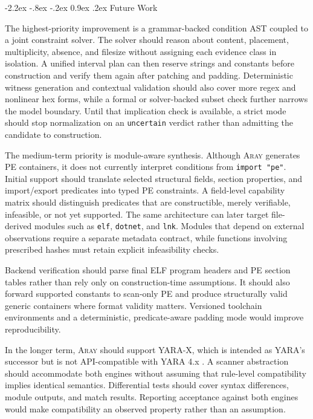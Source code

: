 \documentclass[11pt,twocolumn]{article}
\makeatletter
\newcommand{\tool}{\textsc{Aray}\xspace}
\newcommand{\code}[1]{\texttt{#1}}
\renewcommand\section{\@startsection{section}{1}{\z@}%
  {-2.2ex \@plus -.8ex \@minus -.2ex}%
  {0.9ex \@plus .2ex}%
  {\normalfont\large\bfseries}}
\makeatother
\begin{document}
\section{Future Work}

The highest-priority improvement is a grammar-backed condition AST coupled to a
joint constraint solver. The solver should reason about content, placement,
multiplicity, absence, and filesize without assigning each evidence class in
isolation. A unified interval plan can then reserve strings and constants before
construction and verify them again after patching and padding. Deterministic
witness generation and contextual validation should also cover more regex and
nonlinear hex forms, while a formal or solver-backed subset check further narrows
the model boundary. Until that implication check is available, a strict mode
should stop normalization on an \code{uncertain} verdict rather than admitting
the candidate to construction.

The medium-term priority is module-aware synthesis. Although \tool generates PE
containers, it does not currently interpret conditions from \code{import "pe"}.
Initial support should translate selected structural fields, section properties,
and import/export predicates into typed PE constraints. A field-level capability
matrix should distinguish predicates that are constructible, merely verifiable,
infeasible, or not yet supported. The same architecture can later target
file-derived modules such as \code{elf}, \code{dotnet}, and \code{lnk}. Modules
that depend on external observations require a separate metadata contract, while
functions involving prescribed hashes must retain explicit infeasibility checks.

Backend verification should parse final ELF program headers and PE section tables
rather than rely only on construction-time assumptions. It should also forward
supported constants to scan-only PE and produce structurally valid generic
containers where format validity matters. Versioned toolchain environments and a
deterministic, predicate-aware padding mode would improve reproducibility.

In the longer term, \tool should support YARA-X, which is intended as YARA's
successor but is not API-compatible with YARA 4.x \cite{yaraxdocs}. A scanner
abstraction should accommodate both engines without assuming that rule-level
compatibility implies identical semantics. Differential tests should cover
syntax differences, module outputs, and match results. Reporting acceptance
against both engines would make compatibility an observed property rather than
an assumption.
\end{document}
